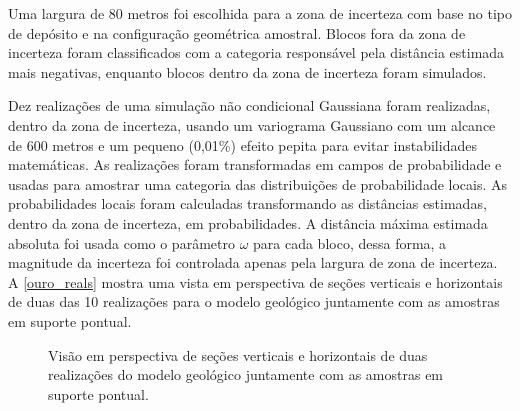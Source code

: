 Uma largura de 80 metros foi escolhida para a zona de incerteza com base no tipo de depósito e na configuração geométrica amostral. Blocos fora da zona de incerteza foram classificados com a categoria responsável pela distância estimada mais negativas, enquanto blocos dentro da zona de incerteza foram simulados.

Dez realizações de uma simulação não condicional Gaussiana foram realizadas, dentro da zona de incerteza, usando um variograma Gaussiano com um alcance de 600 metros e um pequeno (0,01\%) efeito pepita para evitar instabilidades matemáticas. As realizações foram transformadas em campos de probabilidade e usadas para amostrar uma categoria das distribuições de probabilidade locais. As probabilidades locais foram calculadas transformando as distâncias estimadas, dentro da zona de incerteza, em probabilidades. A distância máxima estimada absoluta foi usada como o parâmetro $\omega$ para cada bloco, dessa forma, a magnitude da incerteza foi controlada apenas pela largura de zona de incerteza. A \autoref{ouro_reals} mostra uma vista em perspectiva de seções verticais e horizontais de duas das 10 realizações para o modelo geológico juntamente com as amostras em suporte pontual.

\begin{figure}[H]
	\caption{\label{ouro_reals} Visão em perspectiva de seções verticais e horizontais de duas realizações do modelo geológico juntamente com as amostras em suporte pontual.}
	\centering
     \hspace{1em}
\end{figure}

